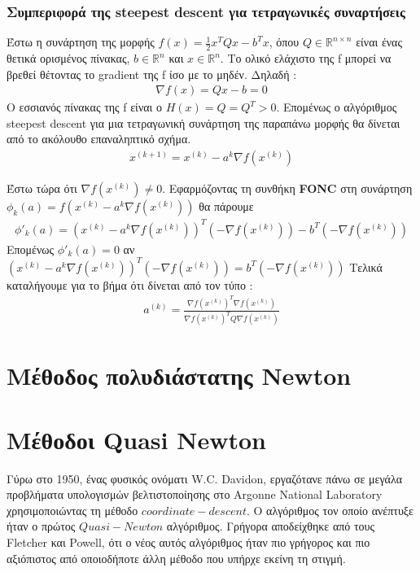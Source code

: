 \documentclass[a4paper,12pt,twoside]{report}
\theoremstyle{plain}
\theoremstyle{definition}
\theoremstyle{remark}
\begin{document}
\subsubsection{Συμπεριφορά της steepest descent για τετραγωνικές συναρτήσεις}

Έστω η συνάρτηση της μορφής $f(x) = \frac{1}{2}x^TQx-b^Tx$, όπου $Q\in \mathbb{R}^{n\times n}$ είναι ένας θετικά ορισμένος πίνακας, $b\in \mathbb{R}^{n}$ και $x\in \mathbb{R}^{n}$. Το ολικό ελάχιστο της f μπορεί να βρεθεί θέτοντας το gradient της f ίσο με το μηδέν. Δηλαδή :
\begin{align*}
\nabla f(x) = Qx-b = 0
\end{align*}
Ο εσσιανός πίνακας της f είναι ο $H(x)=Q=Q^T>0$. Επομένως ο αλγόριθμος steepest descent για μια τετραγωνική συνάρτηση της παραπάνω μορφής θα δίνεται από το ακόλουθο επαναληπτικό σχήμα.
\begin{align}
x^{(k+1)} = x^{(k)} - a^{k}\nabla f(x^{(k)})
\end{align}

Έστω τώρα ότι $\nabla f(x^{(k)})\neq 0$. Εφαρμόζοντας τη συνθήκη \textbf{FONC} στη συνάρτηση $\phi_k(a) = f(x^{(k)} - a^k\nabla f(x^{(k)}))$ θα πάρουμε 
\begin{align*}
\phi' _k(a) = (x^{(k)} - a^k\nabla f(x^{(k)}))^T(-\nabla f(x^{(k)})) - b^T(-\nabla f(x^{(k)}))
\end{align*}
Επομένως $\phi' _k(a) = 0$ αν $(x^{(k)} - a^k\nabla f(x^{(k)}))^T(-\nabla f(x^{(k)})) = b^T(-\nabla f(x^{(k)}))$
Τελικά καταλήγουμε για το βήμα ότι δίνεται από τον τύπο :
\begin{align*}
a^{(k)} = \frac{\nabla f(x^{(k)})^T\nabla f(x^{(k)})}{\nabla f(x^{(k)})^TQ\nabla f(x^{(k)})}
\end{align*}
\section{Μέθοδος πολυδιάστατης Newton}

\section{Μέθοδοι Quasi Newton}
Γύρω στο 1950, ένας φυσικός ονόματι W.C. Davidon, εργαζότανε πάνω σε μεγάλα προβλήματα υπολογισμών βελτιστοποίησης στο Argonne National Laboratory χρησιμοποιώντας τη μέθοδο $coordinate-descent$. Ο αλγόριθμος τον οποίο ανέπτυξε ήταν ο πρώτος $Quasi-Newton$ αλγόριθμος. Γρήγορα αποδείχθηκε από τους Fletcher και Powell, ότι ο νέος αυτός αλγόριθμος ήταν πιο γρήγορος και πιο αξιόπιστος από οποιοδήποτε άλλη μέθοδο που υπήρχε εκείνη τη στιγμή.
\end{document}
